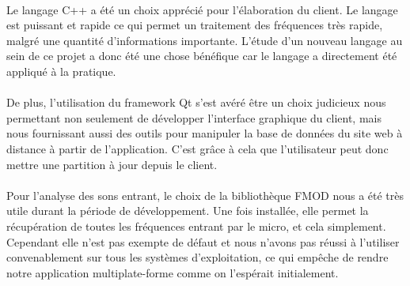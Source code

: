 \paragraph{}
Le langage C++ a été un choix apprécié pour l'élaboration du client. Le langage est puissant et rapide ce qui permet un 
traitement des fréquences très rapide, malgré une quantité d'informations importante. L'étude d'un nouveau langage au sein 
de ce projet a donc été une chose bénéfique car le langage a directement été appliqué à la pratique.

\paragraph{}
De plus, l'utilisation du framework Qt s'est avéré être un choix judicieux nous permettant non seulement de développer l'interface graphique du client, mais nous fournissant aussi des outils pour manipuler la base de données du site web à distance à partir de l'application. C'est grâce à cela que l'utilisateur peut donc mettre une partition à jour depuis le client. 

\paragraph{}
Pour l'analyse des sons entrant, le choix de la bibliothèque FMOD nous a été très utile durant la période de développement. Une fois installée, 
elle permet la récupération de toutes les fréquences entrant par le micro, et cela simplement. \\
Cependant elle n'est pas exempte de défaut et nous n'avons pas réussi à l'utiliser convenablement sur tous les systèmes d'exploitation, ce qui empêche de rendre notre application multiplate-forme comme on l'espérait initialement.

